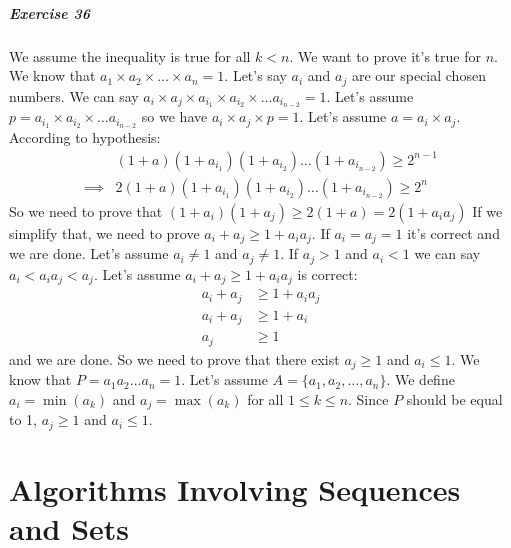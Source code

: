 \documentclass{book}
\begin{document}
	\paragraph{Exercise 36}
	We assume the inequality is true for all $k < n$. We want to prove it's true for $n$. We know that $a_1 \times a_2 \times \dots \times a_n = 1$. Let's say $a_i$ and $a_j$ are our special chosen numbers. We can say $a_i \times a_j \times a_{i_1} \times a_{i_2} \times \dots a_{i_{n - 2}} = 1$. Let's assume $p = a_{i_1} \times a_{i_2} \times \dots a_{i_{n - 2}}$ so we have $a_i \times a_j \times p = 1$. Let's assume $a = a_i \times a_j$. According to hypothesis:
	\begin{equation*}
		\begin{split}
			&(1 + a)(1 + a_{i_1})(1 + a_{i_2}) \dots (1 + a_{i_{n - 2}}) \ge 2^{n - 1} \\
			\implies &2(1 + a)(1 + a_{i_1})(1 + a_{i_2}) \dots (1 + a_{i_{n - 2}}) \ge 2^{n}
		\end{split}
	\end{equation*}
	So we need to prove that $(1 + a_i)(1 + a_j) \ge 2(1 + a) = 2(1 + a_i a_j)$ If we simplify that, we need to prove $a_i + a_j \ge 1 + a_i a_j$. If $a_i = a_j = 1$ it's correct and we are done. Let's assume $a_i \ne 1$ and $a_j \ne 1$. If $a_j > 1$ and $a_i < 1$ we can say $a_i < a_i a_j < a_j$. Let's assume $a_i + a_j \ge 1 + a_i a_j$ is correct:
	\begin{equation*}
		\begin{split}
			a_i + a_j &\ge 1 + a_i a_j \\
			a_i + a_j &\ge 1 + a_i \\
			a_j &\ge 1
		\end{split}
	\end{equation*}
	and we are done. So we need to prove that there exist $a_j \ge 1$ and $a_i \le 1$. We know that $P = a_1 a_2 \dots a_n = 1$. Let's assume $A = \{a_1, a_2, \dots, a_n\}$. We define $a_i = \min(a_k)$ and $a_j = \max(a_k)$ for all $1 \le k \le n$. Since $P$ should be equal to 1, $a_j \ge 1$ and $a_i \le 1$.
	
	\chapter{Algorithms Involving Sequences and Sets}
\end{document}
